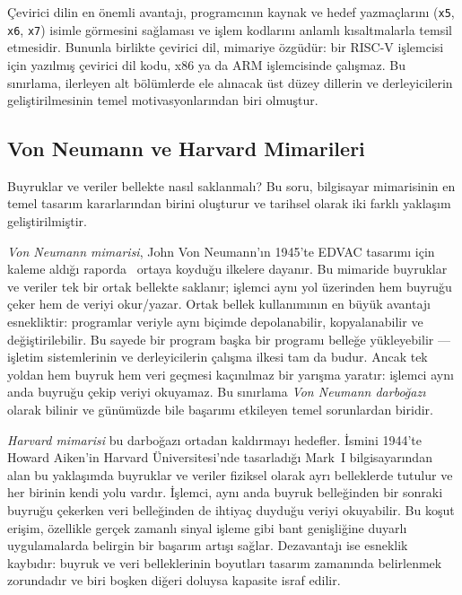 Çevirici dilin en önemli avantajı, programcının kaynak ve hedef yazmaçlarını (\texttt{x5}, \texttt{x6}, \texttt{x7}) isimle görmesini sağlaması ve işlem kodlarını anlamlı kısaltmalarla temsil etmesidir. Bununla birlikte çevirici dil, mimariye özgüdür: bir RISC-V işlemcisi için yazılmış çevirici dil kodu, x86 ya da ARM işlemcisinde çalışmaz. Bu sınırlama, ilerleyen alt bölümlerde ele alınacak üst düzey dillerin ve derleyicilerin geliştirilmesinin temel motivasyonlarından biri olmuştur.

\subsection{Von Neumann ve Harvard Mimarileri}
\label{subsec:vonneumann-harvard}

Buyruklar ve veriler bellekte nasıl saklanmalı? Bu soru, bilgisayar mimarisinin en temel tasarım kararlarından birini oluşturur ve tarihsel olarak iki farklı yaklaşım geliştirilmiştir.

\emph{Von Neumann mimarisi}, John Von Neumann'ın 1945'te EDVAC tasarımı için kaleme aldığı raporda~\cite{vonneumann1945} ortaya koyduğu ilkelere dayanır. Bu mimaride buyruklar ve veriler tek bir ortak bellekte saklanır; işlemci aynı yol üzerinden hem buyruğu çeker hem de veriyi okur/yazar. Ortak bellek kullanımının en büyük avantajı esnekliktir: programlar veriyle aynı biçimde depolanabilir, kopyalanabilir ve değiştirilebilir. Bu sayede bir program başka bir programı belleğe yükleyebilir --- işletim sistemlerinin ve derleyicilerin çalışma ilkesi tam da budur. Ancak tek yoldan hem buyruk hem veri geçmesi kaçınılmaz bir yarışma yaratır: işlemci aynı anda buyruğu çekip veriyi okuyamaz. Bu sınırlama \emph{Von Neumann darboğazı} olarak bilinir ve günümüzde bile başarımı etkileyen temel sorunlardan biridir.

\emph{Harvard mimarisi} bu darboğazı ortadan kaldırmayı hedefler. İsmini 1944'te Howard Aiken'in Harvard Üniversitesi'nde tasarladığı Mark~I bilgisayarından alan bu yaklaşımda buyruklar ve veriler fiziksel olarak ayrı belleklerde tutulur ve her birinin kendi yolu vardır. İşlemci, aynı anda buyruk belleğinden bir sonraki buyruğu çekerken veri belleğinden de ihtiyaç duyduğu veriyi okuyabilir. Bu koşut erişim, özellikle gerçek zamanlı sinyal işleme gibi bant genişliğine duyarlı uygulamalarda belirgin bir başarım artışı sağlar. Dezavantajı ise esneklik kaybıdır: buyruk ve veri belleklerinin boyutları tasarım zamanında belirlenmek zorundadır ve biri boşken diğeri doluysa kapasite israf edilir.

